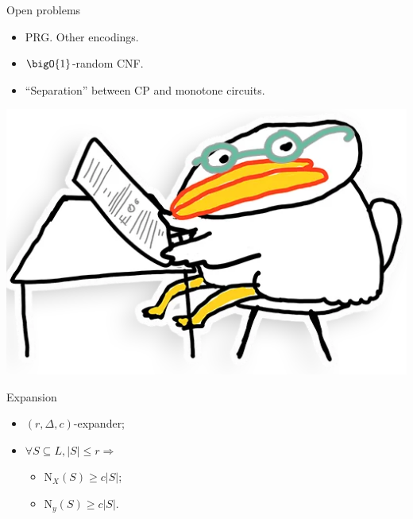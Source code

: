 \begin{frame}{Open problems}

    \begin{itemize}
        \item PRG. Other encodings.
        \item $\bigO{1}$-random CNF.
        \item ``Separation'' between CP and monotone circuits.
    \end{itemize}

    \vspace{1cm}
    \centering
    \includegraphics[scale = 0.1]{pics/utia-think.png}
\end{frame}


\begin{frame}{Expansion}

    \begin{minipage}{0.38\linewidth}
        \centering
        
    \end{minipage}
    \begin{minipage}{0.58\linewidth}
        \begin{itemize}
            \item $(r, \Delta, c)$-expander;
            \item $\forall S \subseteq L, |S| \le r \Rightarrow$
                \begin{itemize}
                    \item $\mathrm{N}_{X}(S) \ge c |S|$;
                    \item $\mathrm{N}_{y}(S) \ge c |S|$.
                \end{itemize}
        \end{itemize}
    \end{minipage}
\end{frame}

